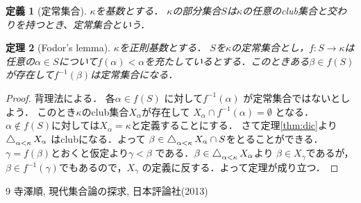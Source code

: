 \documentclass[leqno]{jsarticle}
\newtheorem{thm}{定理}
\newtheorem{df}[thm]{定義}
\newcommand{\al}{\alpha}
\newcommand{\be}{\beta}
\DeclareMathOperator*{\dic}{\scalerel*{\bigtriangleup}{\sum}}
\begin{document}
\begin{df}[定常集合]
$\kappa$を基数とする．
$\kappa$の部分集合$S$は$\kappa$の任意のclub集合と交わりを持つとき、定常集合という．
\end{df}


\begin{thm}[Fodor's lemma]
$\kappa$を正則基数とする．
$S$を$\kappa$の定常集合とし，$f\colon S\to \kappa$は任意の$\al\in S$について$f(\al)<\al$を充たしているとする．このときある$\be\in f(S)$が存在して$f^{-1}(\be)$は定常集合になる．
\end{thm}
\begin{proof}
背理法による．
各$\al\in f(S)$
に対して$f^{-1}(\alpha)$
が定常集合ではないとしよう．
このとき$\kappa$のclub集合$X_{\al}$が存在して
$X_{\al}\cap f^{-1}(\al)=\emptyset$
となる．
$\al\not\in f(S)$に対しては$X_{\al}=\kappa$と定義することにする．
さて定理\ref{thm:dic}より
$\dic_{\al<\kappa}X_{\al}$
はclubになる．よって
$\be\in \dic_{\al<\kappa}X_{\al}\cap S$をとることができる．
$\gamma=f(\be)$とおくと仮定より$\gamma<\be$
である．$\be\in \dic_{\al<\kappa}X_{\al}$より
$\be\in X_{\gamma}$であるが，
$\be\in f^{-1}(\gamma)$でもあるので，$X_{\gamma}$
の定義に反する．よって定理が成り立つ．
\end{proof}
	
\begin{thebibliography}{9}
寺澤順, 現代集合論の探求, 日本評論社(2013)
\end{thebibliography}




			
\end{document}
